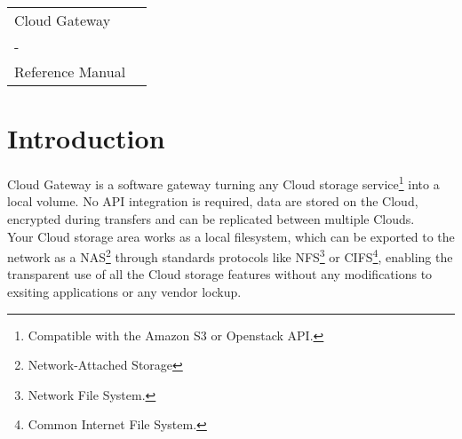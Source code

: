\documentclass[11pt,fleqn,openany]{book} %
\begin{document}

\begingroup
\thispagestyle{empty}
\vspace*{22cm}
\par\normalfont\fontsize{30}{30}\sffamily\selectfont\color{white}
\begin{tabular}{C{10cm}C{2cm}}
Cloud Gateway \\
- & \\
 Reference Manual & \\
\end{tabular}
\endgroup



\pagestyle{empty} %

\cleardoublepage %

\tableofcontents %

\cleardoublepage %

\pagestyle{fancy} %

\chapter{Introduction}
\label{chap:introduction}

Cloud Gateway is a software gateway turning any Cloud storage service\footnote{Compatible with the Amazon S3 or Openstack API.} into a local volume.
No API integration is required, data are stored on the Cloud, encrypted during transfers and can be replicated between multiple Clouds.\\

Your Cloud storage area works as a local filesystem,
which can be exported to the network as a NAS\footnote{Network-Attached Storage} through standards protocols like NFS\footnote{Network File System.} or CIFS\footnote{Common Internet File System.},
enabling the transparent use of all the Cloud storage features without any modifications to exsiting applications or any vendor lockup.
\end{document}
